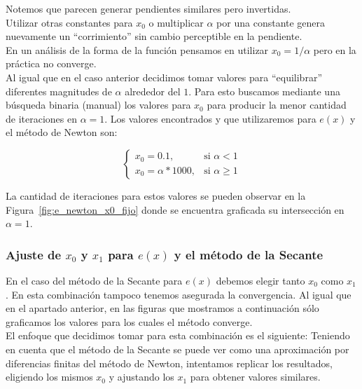 Notemos que parecen generar pendientes similares pero invertidas.\\

Utilizar otras constantes para $x_0$ o multiplicar $\alpha$ por una constante
genera nuevamente un ``corrimiento'' sin cambio perceptible en la pendiente.\\

En un análisis de la forma de la función pensamos en utilizar $x_0 = 1 /
\alpha$ pero en la práctica no converge.\\

Al igual que en el caso anterior decidimos tomar valores para ``equilibrar''
diferentes magnitudes de $\alpha$ alrededor del $1$. Para esto buscamos
mediante una búsqueda binaria (manual) los valores para $x_0$ para producir la
menor cantidad de iteraciones en $\alpha = 1$. Los valores encontrados y que
utilizaremos para $e(x)$ y el método de Newton son:

\[
\begin{cases}
x_0 = 0.1, & \mbox{si } \alpha < 1\\
x_0 = \alpha * 1000, & \mbox{si } \alpha \ge 1
\end{cases}
\]

La cantidad de iteraciones para estos valores se pueden observar en la
Figura~\ref{fig:e_newton_x0_fijo} donde se encuentra graficada su intersección
en $\alpha = 1$.

\subsubsection{Ajuste de $x_0$ y $x_1$ para $e(x)$ y el método de la Secante}

En el caso del método de la Secante para $e(x)$ debemos elegir tanto $x_0$ como
$x_1$. En esta combinación tampoco tenemos asegurada la convergencia. Al igual
que en el apartado anterior, en las figuras que mostramos a continuación sólo
graficamos los valores para los cuales el método converge.\\

El enfoque que decidimos tomar para esta combinación es el siguiente: Teniendo
en cuenta que el método de la Secante se puede ver como una aproximación por
diferencias finitas del método de Newton, intentamos replicar los resultados,
eligiendo los mismos $x_0$ y ajustando los $x_1$ para obtener valores
similares.\\

